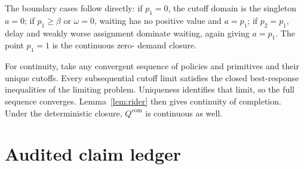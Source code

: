 \documentclass[11pt]{article}
\theoremstyle{definition}
\theoremstyle{remark}
\newcommand{\com}{\mathrm{com}}
\begin{document}
The boundary cases follow directly: if $p_1=0$, the cutoff domain is the
singleton $a=0$; if $p_1\ge\beta$ or $\omega=0$, waiting has no positive
value and $a=p_1$; if $p_2=p_1$, delay and weakly worse assignment dominate
waiting, again giving $a=p_1$.  The point $p_1=1$ is the continuous zero-
demand closure.

For continuity, take any convergent sequence of policies and primitives and
their unique cutoffs.  Every subsequential cutoff limit satisfies the closed
best-response inequalities of the limiting problem.  Uniqueness identifies
that limit, so the full sequence converges.  Lemma~\ref{lem:rider} then gives
continuity of completion.  Under the deterministic closure,
$Q^{\com}$ is continuous as well.

\section{Audited claim ledger}
\end{document}
